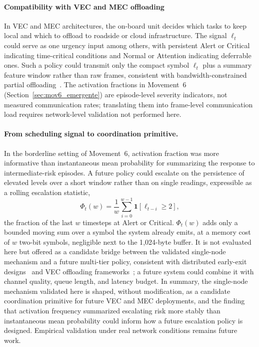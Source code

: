 \documentclass[a4paper,fleqn]{cas-dc}
\begin{document}
\paragraph{Compatibility with VEC and MEC offloading}
In VEC and MEC architectures, the on-board unit decides which tasks to keep
local and which to offload to roadside or cloud infrastructure. The signal
$\ell_t$ could serve as one urgency input among others, with persistent Alert or
Critical indicating time-critical conditions and Normal or Attention indicating
deferrable ones. Such a policy could transmit only the compact symbol $\ell_t$
plus a summary feature window rather than raw frames, consistent with
bandwidth-constrained partial offloading~\cite{uddin2025taskoffloading}. The
activation fractions in Movement~6 (Section~\ref{sec:mov6_emergente}) are
episode-level severity indicators, not measured communication rates; translating
them into frame-level communication load requires network-level validation not
performed here.
\paragraph{From scheduling signal to coordination primitive.}
In the borderline setting of Movement~6, activation fraction was more
informative than instantaneous mean probability for summarizing the response to
intermediate-risk episodes. A future policy could escalate on the persistence of
elevated levels over a short window rather than on single readings, expressible
as a rolling escalation statistic,
\begin{equation}
  \Phi_t(w) = \frac{1}{w}\sum_{i=0}^{w-1} \mathbf{1}\!\left[\ell_{t-i}
  \ge 2\right],
  \label{eq:escalation}
\end{equation}
the fraction of the last $w$ timesteps at Alert or Critical. $\Phi_t(w)$ adds
only a bounded moving sum over a symbol the system already emits, at a memory
cost of $w$ two-bit symbols, negligible next to the 1{,}024-byte buffer. It is
not evaluated here but offered as a candidate bridge between the validated
single-node mechanism and a future multi-tier policy, consistent with
distributed early-exit designs~\cite{peng2025distree} and VEC offloading
frameworks~\cite{uddin2025taskoffloading,abouali2025edgeai}; a future system
could combine it with channel quality, queue length, and latency budget.
In summary, the single-node mechanism validated here is shaped, without
modification, as a candidate coordination primitive for future VEC and MEC
deployments, and the finding that activation frequency summarized escalating
risk more stably than instantaneous mean probability could inform how a future
escalation policy is designed. Empirical validation under real network
conditions remains future work.
\end{document}
